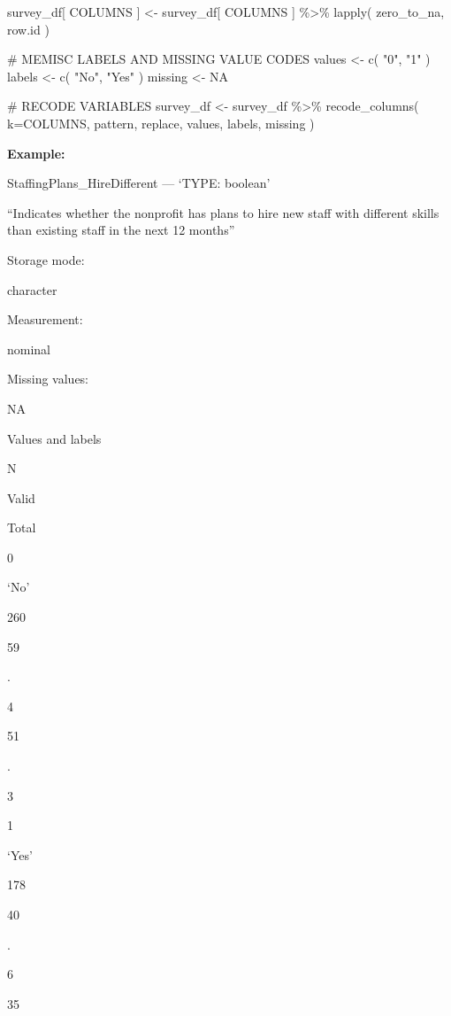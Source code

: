 \documentclass[
  letterpaper,
]{scrbook}
\newenvironment{Shaded}{\begin{snugshade}}{\end{snugshade}}
\newcommand{\AttributeTok}[1]{\textcolor[rgb]{0.40,0.45,0.13}{#1}}
\newcommand{\CommentTok}[1]{\textcolor[rgb]{0.37,0.37,0.37}{#1}}
\newcommand{\ConstantTok}[1]{\textcolor[rgb]{0.56,0.35,0.01}{#1}}
\newcommand{\FunctionTok}[1]{\textcolor[rgb]{0.28,0.35,0.67}{#1}}
\newcommand{\NormalTok}[1]{\textcolor[rgb]{0.00,0.23,0.31}{#1}}
\newcommand{\OtherTok}[1]{\textcolor[rgb]{0.00,0.23,0.31}{#1}}
\newcommand{\SpecialCharTok}[1]{\textcolor[rgb]{0.37,0.37,0.37}{#1}}
\newcommand{\StringTok}[1]{\textcolor[rgb]{0.13,0.47,0.30}{#1}}
\begin{document}
\begin{Shaded}
\begin{Highlighting}[]
\NormalTok{survey\_df[ COLUMNS ] }\OtherTok{\textless{}{-}} 
\NormalTok{  survey\_df[ COLUMNS ] }\SpecialCharTok{\%\textgreater{}\%} 
  \FunctionTok{lapply}\NormalTok{( zero\_to\_na, row.id )}

\CommentTok{\# MEMISC LABELS AND MISSING VALUE CODES }
\NormalTok{values  }\OtherTok{\textless{}{-}} \FunctionTok{c}\NormalTok{( }\StringTok{"0"}\NormalTok{, }\StringTok{"1"}\NormalTok{ )}
\NormalTok{labels  }\OtherTok{\textless{}{-}} \FunctionTok{c}\NormalTok{( }\StringTok{"No"}\NormalTok{, }\StringTok{"Yes"}\NormalTok{ )}
\NormalTok{missing }\OtherTok{\textless{}{-}} \ConstantTok{NA}

\CommentTok{\# RECODE VARIABLES }
\NormalTok{survey\_df }\OtherTok{\textless{}{-}} 
\NormalTok{  survey\_df }\SpecialCharTok{\%\textgreater{}\%} 
  \FunctionTok{recode\_columns}\NormalTok{( }\AttributeTok{k=}\NormalTok{COLUMNS, pattern, replace, values, labels, missing )}
\end{Highlighting}
\end{Shaded}

\textbf{Example:}

StaffingPlans\_HireDifferent --- {`TYPE: boolean'}

``Indicates whether the nonprofit has plans to hire new staff with
different skills than existing staff in the next 12 months''

Storage mode:

character

Measurement:

nominal

Missing values:

NA

Values and labels

N

Valid

Total

0

`No'

260

59

.

4

51

.

3

1

`Yes'

178

40

.

6

35
\end{document}
